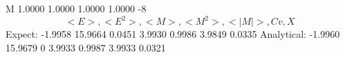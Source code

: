 M
   1.0000   1.0000
   1.0000   1.0000
-8
$$ <E>, <E^2>, <M>, <M^2>, <|M|>, Cv, X$$
Expect:
   -1.9958
   15.9664
    0.0451
    3.9930
    0.9986
   3.9849
   0.0335
Analytical:
   -1.9960
   15.9679
         0
    3.9933
    0.9987
    3.9933
    0.0321